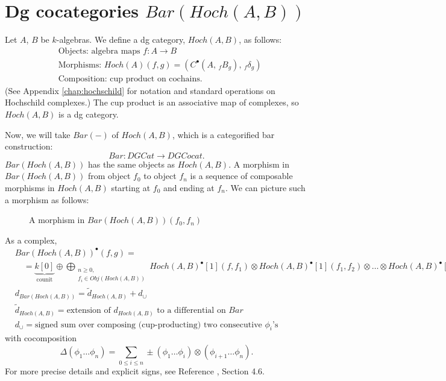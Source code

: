 \section{Dg cocategories $Bar(Hoch(A,B))$}
Let $A$, $B$ be $k$-algebras. We define 
a dg category, $Hoch(A,B)$, as follows:
\begin{align*}
	&\textrm{Objects: algebra maps } f:A \to B\\
	&\textrm{Morphisms: } 
	  Hoch(A)(f,g) = (C^\bullet(A,\, _fB_g),\, _f\delta_g)\\
	&\textrm{Composition: cup product on cochains.}
\end{align*}
(See Appendix \ref{chap:hochschild} for notation and 
standard operations on Hochschild complexes.) 
The cup product is an associative map of complexes, 
so $Hoch(A,B)$ is a dg category.

Now, we will take $Bar(-)$ of $Hoch(A,B)$, which 
is a categorified bar construction:
$$Bar: DGCat \to DGCocat.$$
$Bar(Hoch(A,B))$ has the same objects as 
$Hoch(A,B)$. A morphism in $Bar(Hoch(A,B))$ 
from object $f_0$ to object $f_n$ 
is a sequence of composable morphisms in 
$Hoch(A,B)$ starting at $f_0$ and ending at 
$f_n$. We can picture such a morphism as 
follows:
%
\begin{figure}[H]
\centerline{}
\caption{A morphism in $Bar(Hoch(A,B))(f_0,f_n)$}
\end{figure}
%
As a complex, 
\begin{align*}
&Bar(Hoch(A,B))^\bullet(f,g) 
=\\
&\quad = \underbrace{k[0]}_{\textrm{counit}} \oplus
\bigoplus \limits_{\substack{
	n \geq 0,\\
	f_i \in Obj(Hoch(A,B))}}
{\scriptstyle Hoch(A,B)^\bullet[1](f,f_1) \otimes 
Hoch(A,B)^\bullet[1](f_1,f_2) \otimes \dots \otimes 
Hoch(A,B)^\bullet[1](f_n,g)}\\
%
& d_{Bar(Hoch(A,B))} = 
\tilde{d}_{Hoch(A,B)} + d_\cup\\
%
& \tilde{d}_{Hoch(A,B)} =
\textrm{extension of $d_{Hoch(A,B)}$ 
to a differential on $Bar$}\\
%
& d_\cup = 
\textrm{signed sum over composing (cup-producting) 
two consecutive $\phi_i$'s}
\end{align*}
with cocomposition
$$\Delta(\phi_1\dots \phi_n) = 
\sum \limits_{0 \leq i \leq n}
\pm (\phi_1 \dots \phi_i) \otimes (\phi_{i+1}\dots \phi_n).$$
%
For more precise details and explicit signs, 
see Reference \cite{T}, Section 4.6.